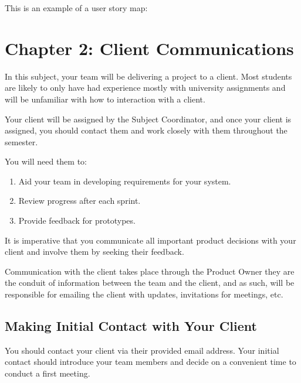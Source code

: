 \documentclass[letterpaper,10pt,english]{jupyterBook}
\begin{document}
\sphinxAtStartPar
This is an example of a user story map:

\sphinxAtStartPar
{}


\chapter{Chapter 2: Client Communications}
\label{\detokenize{chapter_2/client_communications:chapter-2-client-communications}}\label{\detokenize{chapter_2/client_communications::doc}}
\sphinxAtStartPar
In this subject, your team will be delivering a project to a client.
Most students are likely to only have had experience mostly with
university assignments and will be unfamiliar with how to interaction
with a client.

\sphinxAtStartPar
Your client will be assigned by the Subject Coordinator, and once your
client is assigned, you should contact them and work closely with them
throughout the semester.

\sphinxAtStartPar
You will need them to:
\begin{enumerate}
%
\item {} 
\sphinxAtStartPar
Aid your team in developing requirements for your system.

\item {} 
\sphinxAtStartPar
Review progress after each sprint.

\item {} 
\sphinxAtStartPar
Provide feedback for prototypes.

\end{enumerate}

\sphinxAtStartPar
It is imperative that you communicate all important product decisions
with your client and involve them by seeking their feedback.

\sphinxAtStartPar
Communication with the client takes place through the Product Owner \sphinxhyphen{}
they are the conduit of information between the team and the client, and
as such, will be responsible for emailing the client with updates,
invitations for meetings, etc.


\section{Making Initial Contact with Your Client}
\label{\detokenize{chapter_2/client_communications:making-initial-contact-with-your-client}}
\sphinxAtStartPar
You should contact your client via their provided email address. Your
initial contact should introduce your team members and decide on a
convenient time to conduct a first meeting.
\end{document}
